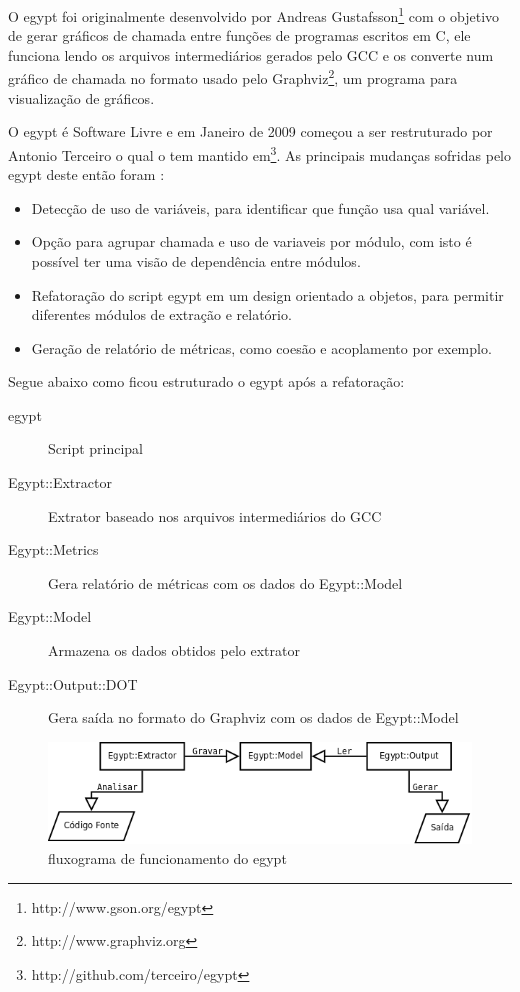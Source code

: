 O egypt foi originalmente desenvolvido por Andreas
Gustafsson\footnote{http://www.gson.org/egypt} com o objetivo de gerar gráficos
de chamada entre funções de programas escritos em C, ele funciona lendo os
arquivos intermediários gerados pelo GCC e os
converte num gráfico de chamada no formato usado pelo
Graphviz\footnote{http://www.graphviz.org}, um programa para visualização de
gráficos.

O egypt é Software Livre e em Janeiro de 2009 começou a ser restruturado por
Antonio Terceiro o qual o tem mantido
em\footnote{http://github.com/terceiro/egypt}. As principais mudanças sofridas
pelo egypt deste então foram \cite{StructuralComplexityEvolution}:

\begin{itemize}
\item Detecção de uso de variáveis, para identificar que função usa qual
variável.
\item Opção para agrupar chamada e uso de variaveis por módulo, com isto é
possível ter uma visão de dependência entre módulos.
\item Refatoração do script egypt em um design orientado a objetos, para
permitir diferentes módulos de extração e relatório.
\item Geração de relatório de métricas, como coesão e acoplamento por exemplo.
\end{itemize}

Segue abaixo como ficou estruturado o egypt após a refatoração:

\begin{description}
\item[egypt] Script principal
\item[Egypt::Extractor] Extrator baseado nos arquivos intermediários do GCC
\item[Egypt::Metrics] Gera relatório de métricas com os dados do Egypt::Model
\item[Egypt::Model] Armazena os dados obtidos pelo extrator
\item[Egypt::Output::DOT] Gera saída no formato do Graphviz com os dados de Egypt::Model
\end{description}

\begin{figure}[h]
\center
\includegraphics[scale=0.5]{imagens/egypt-fluxogram}
\caption{fluxograma de funcionamento do egypt}
\label{egypt-fluxogram}
\end{figure}

